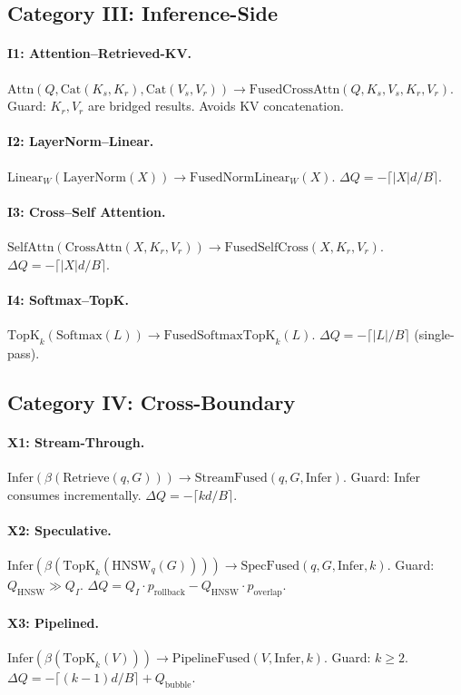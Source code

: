 \documentclass{article}
\theoremstyle{definition}
\theoremstyle{remark}
\newcommand{\ceil}[1]{\lceil #1 \rceil}
\newcommand{\Qhnsw}{Q_{\mathrm{HNSW}}}
\begin{document}
\subsection{Category III: Inference-Side}

\paragraph{I1: Attention--Retrieved-KV.}
$\mathrm{Attn}(Q, \mathrm{Cat}(K_s, K_r), \mathrm{Cat}(V_s, V_r)) \to \mathrm{FusedCrossAttn}(Q, K_s, V_s, K_r, V_r)$.
Guard: $K_r, V_r$ are bridged results. Avoids KV concatenation.

\paragraph{I2: LayerNorm--Linear.}
$\mathrm{Linear}_W(\mathrm{LayerNorm}(X)) \to \mathrm{FusedNormLinear}_W(X)$.
$\Delta Q = -\ceil{|X|d/B}$.

\paragraph{I3: Cross--Self Attention.}
$\mathrm{SelfAttn}(\mathrm{CrossAttn}(X, K_r, V_r)) \to \mathrm{FusedSelfCross}(X, K_r, V_r)$.
$\Delta Q = -\ceil{|X|d/B}$.

\paragraph{I4: Softmax--TopK.}
$\mathrm{TopK}_k(\mathrm{Softmax}(L)) \to \mathrm{FusedSoftmaxTopK}_k(L)$.
$\Delta Q = -\ceil{|L|/B}$ (single-pass).

\subsection{Category IV: Cross-Boundary}

\paragraph{X1: Stream-Through.}
$\mathrm{Infer}(\beta(\mathrm{Retrieve}(q,G))) \to \mathrm{StreamFused}(q, G, \mathrm{Infer})$.
Guard: $\mathrm{Infer}$ consumes incrementally. $\Delta Q = -\ceil{kd/B}$.

\paragraph{X2: Speculative.}
$\mathrm{Infer}(\beta(\mathrm{TopK}_k(\mathrm{HNSW}_q(G)))) \to \mathrm{SpecFused}(q, G, \mathrm{Infer}, k)$.
Guard: $\Qhnsw \gg Q_I$. $\Delta Q = Q_I \cdot p_{\text{rollback}} - \Qhnsw \cdot p_{\text{overlap}}$.

\paragraph{X3: Pipelined.}
$\mathrm{Infer}(\beta(\mathrm{TopK}_k(V))) \to \mathrm{PipelineFused}(V, \mathrm{Infer}, k)$.
Guard: $k \geq 2$. $\Delta Q = -\ceil{(k-1)d/B} + Q_{\text{bubble}}$.
\end{document}
